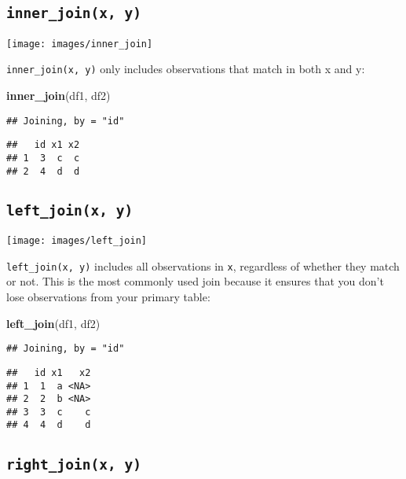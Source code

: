\documentclass[]{book}
\newenvironment{Shaded}{\begin{snugshade}}{\end{snugshade}}
\newcommand{\KeywordTok}[1]{\textcolor[rgb]{0.13,0.29,0.53}{\textbf{{#1}}}}
\newcommand{\NormalTok}[1]{{#1}}
\begin{document}
\subsection{\texorpdfstring{\texttt{inner\_join(x,\ y)}}{inner\_join(x, y)}}\label{inner_joinx-y}

\texttt{[image: images/inner\_join]}

\texttt{inner\_join(x,\ y)} only includes observations that match in
both x and y:

\begin{Shaded}
\begin{Highlighting}[]
\KeywordTok{inner_join}\NormalTok{(df1, df2)}
\end{Highlighting}
\end{Shaded}

\begin{verbatim}
## Joining, by = "id"
\end{verbatim}

\begin{verbatim}
##   id x1 x2
## 1  3  c  c
## 2  4  d  d
\end{verbatim}

\subsection{\texorpdfstring{\texttt{left\_join(x,\ y)}}{left\_join(x, y)}}\label{left_joinx-y}

\texttt{[image: images/left\_join]}

\texttt{left\_join(x,\ y)} includes all observations in \texttt{x},
regardless of whether they match or not. This is the most commonly used
join because it ensures that you don't lose observations from your
primary table:

\begin{Shaded}
\begin{Highlighting}[]
\KeywordTok{left_join}\NormalTok{(df1, df2)}
\end{Highlighting}
\end{Shaded}

\begin{verbatim}
## Joining, by = "id"
\end{verbatim}

\begin{verbatim}
##   id x1   x2
## 1  1  a <NA>
## 2  2  b <NA>
## 3  3  c    c
## 4  4  d    d
\end{verbatim}

\subsection{\texorpdfstring{\texttt{right\_join(x,\ y)}}{right\_join(x, y)}}\label{right_joinx-y}
\end{document}
